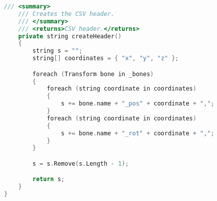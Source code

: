 \begin{lstlisting}[language=C++]
    /// <summary>
    /// Creates the CSV header.
    /// </summary>
    /// <returns>CSV header.</returns>
    private string createHeader()
    {
        string s = "";
        string[] coordinates = { "x", "y", "z" };

        foreach (Transform bone in _bones)
        {
            foreach (string coordinate in coordinates)
            {
                s += bone.name + "_pos" + coordinate + ",";
            }
            foreach (string coordinate in coordinates)
            {
                s += bone.name + "_rot" + coordinate + ",";
            }
        }

        s = s.Remove(s.Length - 1);

        return s;
    }
}
\end{lstlisting}

